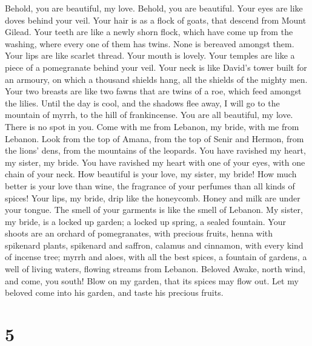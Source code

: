  Behold, you are beautiful, my love. Behold, you are
beautiful. Your eyes are like doves behind your veil. Your hair is as a
flock of goats, that descend from Mount Gilead.  Your
teeth are like a newly shorn flock, which have come up from the washing,
where every one of them has twins. None is bereaved amongst them.
 Your lips are like scarlet thread. Your mouth is lovely.
Your temples are like a piece of a pomegranate behind your veil.
 Your neck is like David's tower built for an armoury, on
which a thousand shields hang, all the shields of the mighty men.
 Your two breasts are like two fawns that are twins of a
roe, which feed amongst the lilies.  Until the day is
cool, and the shadows flee away, I will go to the mountain of myrrh, to
the hill of frankincense.  You are all beautiful, my love.
There is no spot in you.  Come with me from Lebanon, my
bride, with me from Lebanon. Look from the top of Amana, from the top of
Senir and Hermon, from the lions' dens, from the mountains of the
leopards.  You have ravished my heart, my sister, my
bride. You have ravished my heart with one of your eyes, with one chain
of your neck.  How beautiful is your love, my sister, my
bride! How much better is your love than wine, the fragrance of your
perfumes than all kinds of spices!  Your lips, my bride,
drip like the honeycomb. Honey and milk are under your tongue. The smell
of your garments is like the smell of Lebanon.  My
sister, my bride, is a locked up garden; a locked up spring, a sealed
fountain.  Your shoots are an orchard of pomegranates,
with precious fruits, henna with spikenard plants, 
spikenard and saffron, calamus and cinnamon, with every kind of incense
tree; myrrh and aloes, with all the best spices,  a
fountain of gardens, a well of living waters, flowing streams from
Lebanon. Beloved  Awake, north wind, and come, you south!
Blow on my garden, that its spices may flow out. Let my beloved come
into his garden, and taste his precious fruits.

\hypertarget{section-4}{%
\section{5}\label{section-4}}

